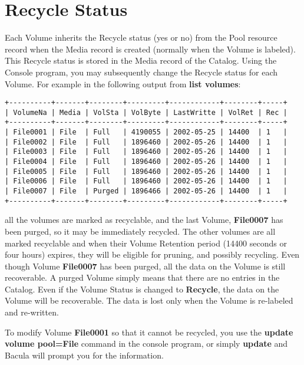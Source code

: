 \section{Recycle Status}

Each Volume inherits the Recycle status (yes or no) from the Pool resource
record when the Media record is created (normally when the Volume is labeled).
This Recycle status is stored in the Media record of the Catalog. Using
the Console program, you may subsequently change the Recycle status for each
Volume. For example in the following output from {\bf list volumes}: 

\footnotesize
\begin{verbatim}
+----------+-------+--------+---------+------------+--------+-----+
| VolumeNa | Media | VolSta | VolByte | LastWritte | VolRet | Rec |
+----------+-------+--------+---------+------------+--------+-----+
| File0001 | File  | Full   | 4190055 | 2002-05-25 | 14400  | 1   |
| File0002 | File  | Full   | 1896460 | 2002-05-26 | 14400  | 1   |
| File0003 | File  | Full   | 1896460 | 2002-05-26 | 14400  | 1   |
| File0004 | File  | Full   | 1896460 | 2002-05-26 | 14400  | 1   |
| File0005 | File  | Full   | 1896460 | 2002-05-26 | 14400  | 1   |
| File0006 | File  | Full   | 1896460 | 2002-05-26 | 14400  | 1   |
| File0007 | File  | Purged | 1896466 | 2002-05-26 | 14400  | 1   |
+----------+-------+--------+---------+------------+--------+-----+
\end{verbatim}
\normalsize

all the volumes are marked as recyclable, and the last Volume, {\bf File0007}
has been purged, so it may be immediately recycled. The other volumes are all
marked recyclable and when their Volume Retention period (14400 seconds or four
hours) expires, they will be eligible for pruning, and possibly recycling.
Even though Volume {\bf File0007} has been purged, all the data on the Volume
is still recoverable. A purged Volume simply means that there are no entries
in the Catalog. Even if the Volume Status is changed to {\bf Recycle}, the
data on the Volume will be recoverable. The data is lost only when the Volume
is re-labeled and re-written. 

To modify Volume {\bf File0001} so that it cannot be recycled, you use the
{\bf update volume pool=File} command in the console program, or simply {\bf
update} and Bacula will prompt you for the information. 

